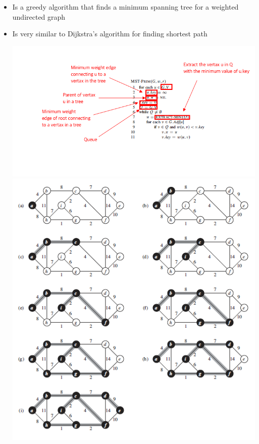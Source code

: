 \documentclass[12pt]{article}
\begin{document}
\begin{enumerate}[1.]
\begin{itemize}
        \begin{itemize}
            \item Is a greedy algorithm that finds a minimum spanning tree for a
            weighted undirected graph
            \item Is very similar to Dijkstra's algorithm for finding shortest path
            \begin{center}
            \includegraphics[width=\linewidth]{images/worksheet_4_solution_41.png}
            \includegraphics[width=\linewidth]{images/worksheet_4_solution_42.png}
            \end{center}
        \end{itemize}
    \end{itemize}


\end{enumerate}
\end{document}

